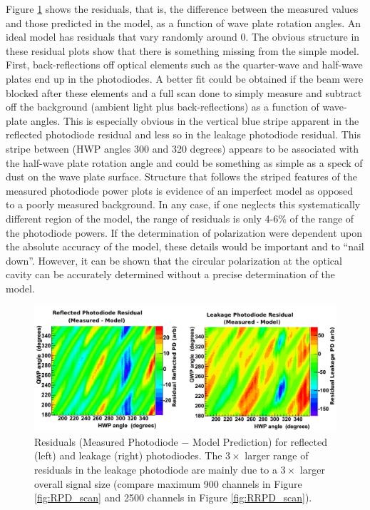 Figure \ref{fig:PD_residuals} shows the residuals, that is, the difference between the measured values and those predicted in the model, as a function of wave plate rotation angles. An ideal model has residuals that vary randomly around 0. The obvious structure in these residual plots show that there is something missing from the simple model. First, back-reflections off optical elements such as the quarter-wave and half-wave plates end up in the photodiodes. A better fit could be obtained if the beam were blocked after these elements and a full scan done to simply measure and subtract off the background (ambient light plus back-reflections) as a function of wave-plate angles. This is especially obvious in the vertical blue stripe apparent in the reflected photodiode residual and less so in the leakage photodiode residual. This stripe between (HWP angles 300 and 320 degrees) appears to be associated with the half-wave plate rotation angle and could be something as simple as a speck of dust on the wave plate surface. Structure that follows the striped features of the measured photodiode power plots is evidence of an imperfect model as opposed to a poorly measured background. In any case, if one neglects this systematically different region of the model, the range of residuals is only 4-6\% of the range of the photodiode powers. If the determination of polarization were dependent upon the absolute accuracy of the model, these details would be important and to ``nail down''. However, it can be shown that the circular polarization at the optical cavity can be accurately determined without a precise determination of the model. 

\begin{figure}[ht]
\centering
\includegraphics[width=5.6in]{./Pictures/Residual.png}
\caption{\label{fig:PD_residuals}Residuals (Measured Photodiode $-$ Model Prediction) for reflected (left) and leakage (right) photodiodes. The $3\times$ larger range of residuals in the leakage photodiode are mainly due to a $3\times$ larger overall signal size (compare maximum 900 channels in Figure \ref{fig:RPD_scan} and 2500 channels in Figure \ref{fig:RRPD_scan}).}
\end{figure}


